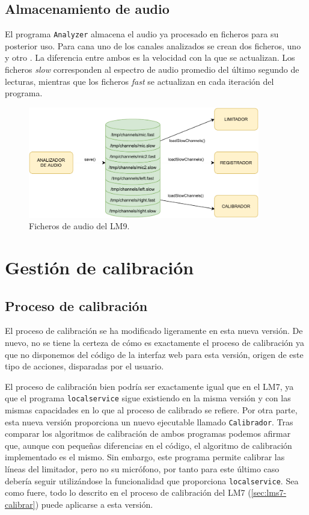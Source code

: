 \subsection{Almacenamiento de audio}

El programa \verb|Analyzer| almacena el audio ya procesado en ficheros para su posterior uso. Para cana uno de los canales analizados se crean dos ficheros, uno  y otro . La diferencia entre ambos es la velocidad con la que se actualizan. Los ficheros \textit{slow} corresponden al espectro de audio promedio del último segundo de lecturas, mientras que los ficheros \textit{fast} se actualizan en cada iteración del programa.

\begin{figure}[h]
    \centering
    \includegraphics[width=0.9\textwidth]{figuras/lms9-audio-files.pdf}
    \caption{Ficheros de audio del \acrshort{LM9}.}
    \label{fig:lms9-audio-files}
\end{figure}


\section{Gestión de calibración}

\subsection{Proceso de calibración}

El proceso de calibración se ha modificado ligeramente en esta nueva versión. De nuevo, no se tiene la certeza de cómo es exactamente el proceso de calibración ya que no disponemos del código de la interfaz web para esta versión, origen de este tipo de acciones, disparadas por el usuario.

El proceso de calibración bien podría ser exactamente igual que en el \acrshort{LM7}, ya que el programa \verb|localservice| sigue existiendo en la misma versión y con las mismas capacidades en lo que al proceso de calibrado se refiere. Por otra parte, esta nueva versión proporciona un nuevo ejecutable llamado \verb|Calibrador|. Tras comparar los algoritmos de calibración de ambos programas podemos afirmar que, aunque con pequeñas diferencias en el código, el algoritmo de calibración implementado es el mismo. Sin embargo, este programa permite calibrar las líneas del limitador, pero no su micrófono, por tanto para este último caso debería seguir utilizándose la funcionalidad que proporciona \verb|localservice|. Sea como fuere, todo lo descrito en el proceso de calibración del \acrshort{LM7} (\ref{sec:lms7-calibrar}) puede aplicarse a esta versión.

